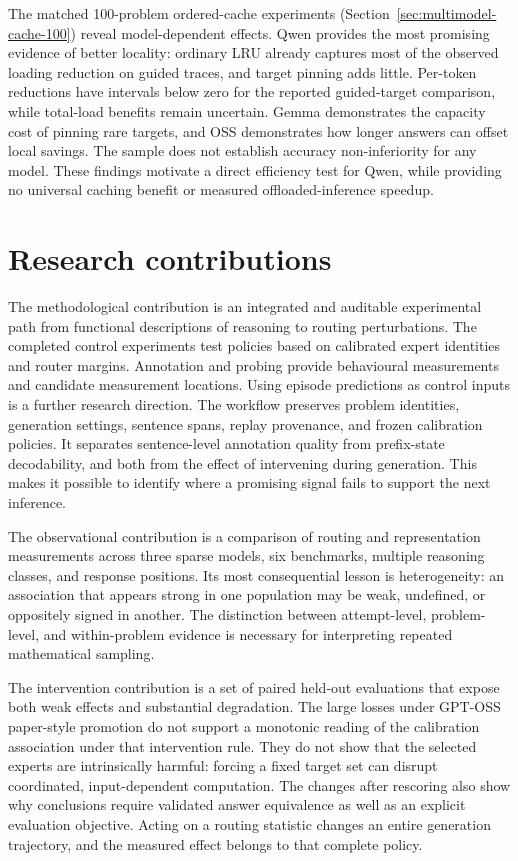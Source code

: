 \documentclass[12pt,a4paper,twoside,openright]{book}
\begin{document}
The matched 100-problem ordered-cache experiments
(Section~\ref{sec:multimodel-cache-100}) reveal model-dependent effects.
Qwen provides the most promising evidence of better locality: ordinary
LRU already captures most of the observed loading reduction on guided
traces, and target pinning adds little. Per-token reductions have intervals
below zero for the reported guided-target comparison, while total-load
benefits remain uncertain. Gemma demonstrates the capacity cost of pinning
rare targets, and OSS demonstrates how longer answers can offset local
savings. The sample does not establish accuracy non-inferiority for any
model. These findings motivate a direct efficiency test for Qwen, while
providing no universal caching benefit or measured offloaded-inference speedup.

\section{Research contributions}

The methodological contribution is an integrated and auditable experimental
path from functional descriptions of reasoning to routing perturbations. The
completed control experiments test policies based on calibrated expert
identities and router margins. Annotation and probing provide behavioural
measurements and candidate measurement locations. Using episode predictions as
control inputs is a further research direction. The workflow preserves problem
identities, generation settings, sentence spans, replay provenance, and frozen
calibration policies. It separates sentence-level annotation quality from
prefix-state decodability, and both from the effect of intervening during
generation. This makes it possible to identify where a promising signal fails
to support the next inference.

The observational contribution is a comparison of routing and representation
measurements across three sparse models, six benchmarks, multiple reasoning
classes, and response positions. Its most consequential lesson is
heterogeneity: an association that appears strong in one population may be
weak, undefined, or oppositely signed in another. The distinction between
attempt-level, problem-level, and within-problem evidence is necessary for
interpreting repeated mathematical sampling.

The intervention contribution is a set of paired held-out evaluations
that expose both weak effects and substantial degradation. The large
losses under GPT-OSS paper-style promotion do not support a monotonic
reading of the calibration association under that intervention rule. They
do not show that the selected experts are intrinsically harmful: forcing
a fixed target set can disrupt coordinated, input-dependent computation. The changes after rescoring also show why conclusions require validated
answer equivalence as well as an explicit evaluation objective. Acting on a routing statistic changes an entire generation
trajectory, and the measured effect belongs to that complete policy.
\end{document}
